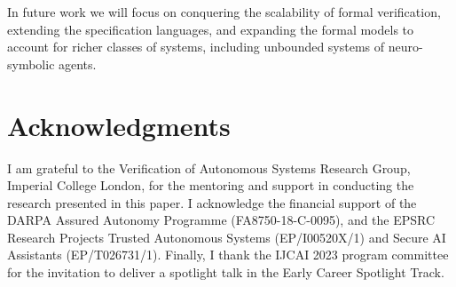 \documentclass{article}
\begin{document}
In future work we will focus on conquering the scalability of formal
verification, extending the specification languages, and  expanding the formal
models to account for richer classes of systems, including unbounded systems of 
neuro-symbolic agents.







\section*{Acknowledgments}

I am grateful to the Verification of Autonomous Systems Research Group, Imperial
College London, for the mentoring and support in conducting the research
presented in this paper. I acknowledge the financial support of the DARPA
Assured Autonomy Programme (FA8750-18-C-0095), and the EPSRC Research Projects 
Trusted Autonomous Systems (EP/I00520X/1) and  Secure AI Assistants
(EP/T026731/1). Finally, I thank the IJCAI 2023 program committee for the
invitation to deliver a spotlight talk in the Early Career Spotlight Track.





\end{document}

